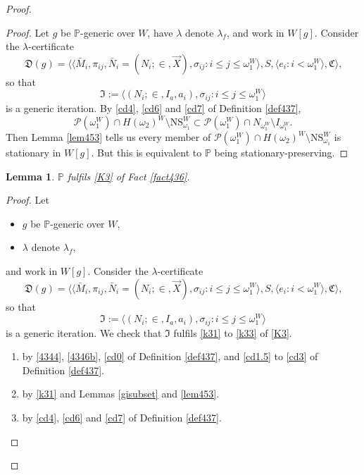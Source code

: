 \documentclass[12pt, twoside]{memoir}
\numberwithin{equation}{section}
\newtheorem{lem}[thm]{Lemma}
\theoremstyle{definition}
\theoremstyle{remark}
\theoremstyle{definition}
\theoremstyle{definition}
\theoremstyle{definition}
\theoremstyle{remark}
\begin{document}
\begin{proof}
\begin{proof}
Let $g$ be $\mathbb{P}$-generic over $W$, have $\lambda$ denote $\lambda_f$, and work in $W[g]$. Consider the $\lambda$-certificate
\begin{equation*}
    \mathfrak{D}(g) = \langle \langle \bar{M}_i, \pi_{ij},  \bar{N}_i = (N_i; \in, \Vec{X}), \sigma_{ij} : i \leq j \leq \omega_1^{W} \rangle, S, \langle e_i : i < \omega_1^W \rangle, \mathfrak{C} \rangle \text{,}
\end{equation*}
so that 
\begin{equation*}
    \mathfrak{I} := \langle (N_i; \in, I_a, a_i), \sigma_{ij} : i \leq j \leq \omega_1^{W} \rangle
\end{equation*}
is a generic iteration. By \ref{cd4}, \ref{cd6} and \ref{cd7} of Definition \ref{def437}, 
\begin{equation*}
    \mathcal{P}(\omega_1^W) \cap H(\omega_2)^W \setminus \mathrm{NS}_{\omega_1}^W \subset \mathcal{P}(\omega_1^W) \cap N_{\omega_1^W} \setminus I_{\omega_1^W} \text{.}
\end{equation*}
Then Lemma \ref{lem453} tells us every member of $\mathcal{P}(\omega_1^W) \cap H(\omega_2)^W \setminus \mathrm{NS}_{\omega_1}^W$ is stationary in $W[g]$. But this is equivalent to $\mathbb{P}$ being stationary-preserving.
\end{proof}

\begin{lem}\label{lem455}
$\mathbb{P}$ fulfils \ref{K3} of Fact \ref{fact436}.
\end{lem}

\begin{proof}
Let 
\begin{itemize}
    \item $g$ be $\mathbb{P}$-generic over $W$,
    \item $\lambda$ denote $\lambda_f$, 
\end{itemize} 
and work in $W[g]$. Consider the $\lambda$-certificate
\begin{equation*}
    \mathfrak{D}(g) = \langle \langle \bar{M}_i, \pi_{ij},  \bar{N}_i = (N_i; \in, \Vec{X}), \sigma_{ij} : i \leq j \leq \omega_1^{W} \rangle, S, \langle e_i : i < \omega_1^W \rangle, \mathfrak{C} \rangle \text{,}
\end{equation*}
so that 
\begin{equation*}
    \mathfrak{I} := \langle (N_i; \in, I_a, a_i), \sigma_{ij} : i \leq j \leq \omega_1^{W} \rangle
\end{equation*}
is a generic iteration. We check that $\mathfrak{I}$ fulfils \ref{k31} to \ref{k33} of \ref{K3}.
\begin{enumerate}[label=That \ref{k3\arabic*} holds:, leftmargin=100pt]
    \item by \ref{4344}, \ref{4346b}, \ref{cd0} of Definition \ref{def437}, and \ref{cd1.5} to \ref{cd3} of Definition \ref{def437}.
    \item by \ref{k31} and Lemmas \ref{gisubset} and \ref{lem453}.
    \item by \ref{cd4}, \ref{cd6} and \ref{cd7} of Definition \ref{def437}. \qedhere
\end{enumerate}
\end{proof}


\end{proof}
\end{document}
